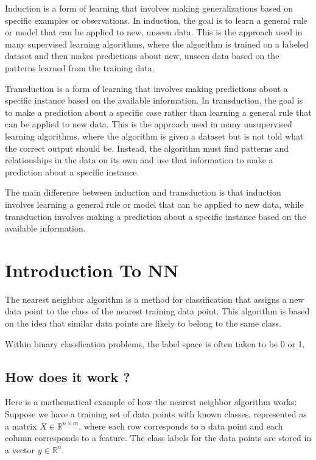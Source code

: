 \documentclass{article}
\theoremstyle{mytheoremstyle}
\theoremstyle{mytheoremstyle}
\theoremstyle{myproblemstyle}
\begin{document}
\begin{definition}[Induction]
	Induction is a form of learning that involves making generalizations based on specific examples or observations. In induction, the goal is to learn a general rule or model that can be applied to new, unseen data. This is the approach used in many supervised learning algorithms, where the algorithm is trained on a labeled dataset and then makes predictions about new, unseen data based on the patterns learned from the training data.

\end{definition}

\begin{definition}[Transduction]
	Transduction is a form of learning that involves making predictions about a specific instance based on the available information. In transduction, the goal is to make a prediction about a specific case rather than learning a general rule that can be applied to new data. This is the approach used in many unsupervised learning algorithms, where the algorithm is given a dataset but is not told what the correct output should be. Instead, the algorithm must find patterns and relationships in the data on its own and use that information to make a prediction about a specific instance.

\end{definition}
The main difference between induction and transduction is that induction involves learning a general rule or model that can be applied to new data, while transduction involves making a prediction about a specific instance based on the available information.

\newpage
\section{Introduction To NN}
\begin{definition}
	The nearest neighbor algorithm is a method for classification that assigns a new data point to the class of the nearest training data point. This algorithm is based on the idea that similar data points are likely to belong to the same class.
\end{definition}

Within binary classfication problems, the label space is often taken to be 0 or 1.

\subsection{How does it work ? }
Here is a mathematical example of how the nearest neighbor algorithm works:
Suppose we have a training set of data points with known classes, represented as a matrix $X \in \mathbb{R}^{n \times m}$, where each row corresponds to a data point and each column corresponds to a feature. The class labels for the data points are stored in a vector $y \in \mathbb{R}^n$.
\end{document}
